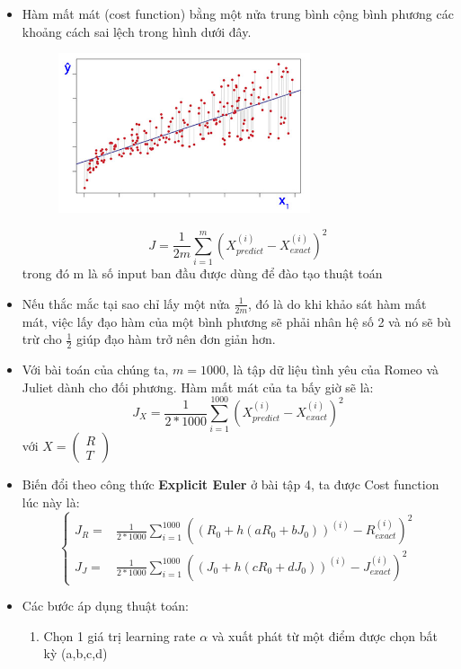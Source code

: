 \begin{itemize}
    \item Hàm mất mát (cost function) bằng một nửa trung bình cộng bình phương các khoảng cách sai lệch trong hình dưới đây.
     \begin{figure}[H]
        \centering
        \includegraphics[width=0.7\textwidth]{image/bt5/lt_cost.jpg}
        \end{figure}
        $$J= \frac{1}{2m} \sum_{i=1}^{m} ( X_{predict}^{(i)} - X_{exact}^{(i)}) ^{2}$$
        trong đó m là số input ban đầu được dùng để đào tạo thuật toán
        \item Nếu thắc mắc tại sao chỉ lấy một nửa $\frac{1}{2m}$, đó là do khi khảo sát hàm mất mát, việc lấy đạo hàm của một bình phương sẽ phải nhân hệ số 2 và nó sẽ bù trừ cho $\frac{1}{2}$ giúp đạo hàm trở nên đơn giản hơn.
        \item Với bài toán của chúng ta, $m=1000$, là tập dữ liệu tình yêu của Romeo và Juliet dành cho đối phương. Hàm mất mát của ta bấy giờ sẽ là:
        $$J_{X}=\frac{1}{2*1000} \sum_{i=1}^{1000} ( X_{predict}^{(i)} - X_{exact}^{(i)}) ^{2}$$
        với $X=\begin{pmatrix}
        R\\ T
\end{pmatrix}$
        \item Biến đổi theo công thức \textbf{Explicit Euler} ở bài tập 4, ta được Cost function lúc này là:
        $$\left\{\begin{matrix}
J_R= & \frac{1}{2*1000} \sum_{i=1}^{1000} ( (R_{0}+h(aR_{0}+bJ_{0}))^{(i)} - R_{exact}^{(i)}) ^{2} \\ 
J_J= & \frac{1}{2*1000} \sum_{i=1}^{1000} ( (J_{0}+h(cR_{0}+dJ_{0}))^{(i)} - J_{exact}^{(i)}) ^{2}
\end{matrix}\right.$$
    \item Các bước áp dụng thuật toán:
    \begin{enumerate}
        \item Chọn 1 giá trị learning rate $\alpha$ và xuất phát từ một điểm được chọn bất kỳ (a,b,c,d)

\end{enumerate}
\end{itemize}
